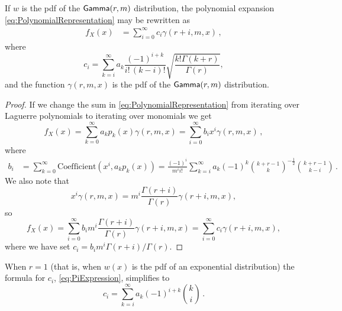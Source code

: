 \begin{lemma}\label{Lemma:PseudoMixtureOfGammas}
If $w$ is the pdf of the $\mathsf{Gamma}(r,m)$ distribution, the polynomial expansion \eqref{eq:PolynomialRepresentation}  may be rewritten as
\begin{align}\label{eq:PseudoMixtureOfGammas}
f_{X}(x)&= \sum_{i=0}^{\infty} c_i \gamma(r+i,m,x) \,,
\end{align}
where
\begin{equation}\label{eq:PiExpression}
c_i
=\sum_{k=i}^\infty a_k \frac{(-1)^{i+k}}{i! \, (k-i)!} \sqrt{\frac{k! \Gamma(k+r)}{\Gamma(r)}},
\end{equation}
and the function $\gamma(r,m,x)$ is the pdf of the $\mathsf{Gamma}(r,m)$ distribution.
\end{lemma}
\begin{proof}
If we change the sum in \eqref{eq:PolynomialRepresentation} from iterating over Laguerre polynomials to iterating over monomials we get
\[
f_{X}(x)=\sum_{k=0}^{\infty} a_k p_{k}(x) \gamma(r,m,x) = \sum_{i=0}^\infty b_i x^i \gamma(r,m,x) \,,
\]
where
\begin{align*}
b_i
&= \sum_{k=0}^\infty \text{Coefficient}(x^i, a_k  p_k(x))
= \frac{(-1)^i}{m^i i!} \sum_{k=i}^\infty a_k (-1)^{k} \binom{k + r - 1}{k}^{-\frac12} \binom{k + r - 1}{k - i} \,.
\end{align*}
We also note that
\[ x^i \gamma(r, m, x) = m^i \frac{\Gamma(r+i)}{\Gamma(r)} \gamma(r+i, m, x), \]
so
\[ f_{X}(x) = \sum_{i=0}^\infty b_i m^i \frac{\Gamma(r+i)}{\Gamma(r)} \gamma(r+i, m, x) =  \sum_{i=0}^\infty c_i \gamma(r+i, m, x),  \]
where we have set $c_i = b_i m^i \Gamma(r+i) / \Gamma(r)$.
\end{proof}

\begin{remark}
When $r=1$ (that is, when $w(x)$ is the pdf of an exponential distribution) the formula for $c_i$, \eqref{eq:PiExpression}, simplifies to
\[ c_i = \sum_{k=i}^\infty a_k (-1)^{i+k} \binom{k}{i} \,. \]
\remQED
\end{remark}

